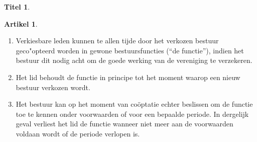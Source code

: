\documentclass[a4paper,10pt]{article}
\theoremstyle{definition}
\newtheorem{titel}{\newline\Large Titel}
\newtheorem{artikelbase}{\large Artikel}
\newenvironment{artikel}
  {\begin{artikelbase}}
  {\smallskip
   \end{artikelbase}}
\newcommand{\ttextenum}{\mbox{}}
\begin{document}
\begin{titel}
  \begin{artikel}\label{bestuur-cooptatie}\ttextenum
    \begin{enumerate}
      \item
        Verkiesbare leden kunnen te allen tijde door het verkozen bestuur geco"opteerd worden in gewone bestuursfuncties (``de functie''), indien het bestuur dit nodig acht om de goede werking van de vereniging te verzekeren.
      \item
        Het lid behoudt de functie in principe tot het moment waarop een nieuw bestuur verkozen wordt.
      \item\label{bestuur-cooptatie-beperkt}
        Het bestuur kan op het moment van co\"optatie echter beslissen om de functie toe te kennen onder voorwaarden of voor een bepaalde periode.
        In dergelijk geval verliest het lid de functie wanneer niet meer aan de voorwaarden voldaan wordt of de periode verlopen is.
    \end{enumerate}
  \end{artikel}

\end{titel}
\end{document}
